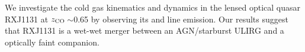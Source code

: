 \documentclass[]{emulateapj}
\begin{document}

We investigate the cold gas kinematics and dynamics in
the lensed optical quasar RXJ1131 at $z_{\rm CO}$\,$\sim$0.65
by observing its \bco and \cco line emission.
Our results suggest that RXJ1131 is a wet-wet merger between an AGN/starburst
ULIRG and a optically faint companion.



\end{document}
